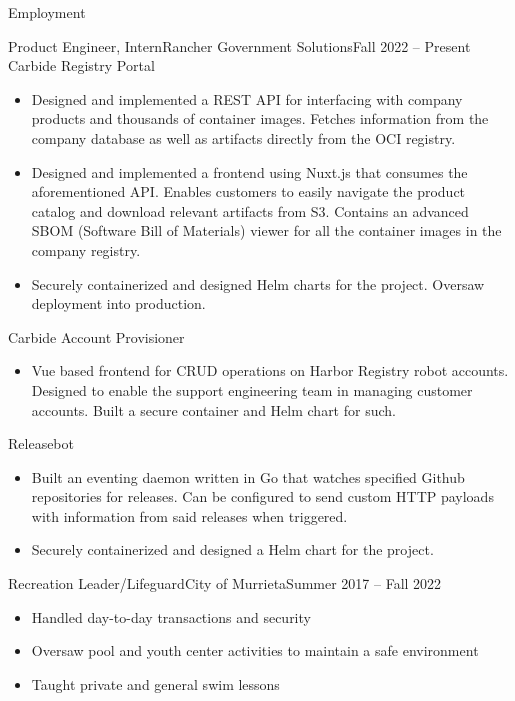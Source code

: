 \documentclass[]{resume}
\begin{document}
	\makeheader
	
	\begin{cvsection}{Employment}
		\begin{cvsubsection}{Product Engineer, Intern}{Rancher Government Solutions}{Fall 2022 -- Present}
			Carbide Registry Portal
			\begin{itemize}
				\item Designed and implemented a REST API for interfacing with company products and thousands of container images. Fetches information from the company database as well as artifacts directly from the OCI registry.
				\item Designed and implemented a frontend using Nuxt.js that consumes the aforementioned API. Enables customers to easily navigate the product catalog and download relevant artifacts from S3. Contains an advanced SBOM (Software Bill of Materials) viewer for all the container images in the company registry.
                \item Securely containerized and designed Helm charts for the project. Oversaw deployment into production.
			\end{itemize}
            Carbide Account Provisioner
            \begin{itemize}
                \item Vue based frontend for CRUD operations on Harbor Registry robot accounts. Designed to enable the support engineering team in managing customer accounts. Built a secure container and Helm chart for such.
            \end{itemize}
			Releasebot
			\begin{itemize}
				\item Built an eventing daemon written in Go that watches specified Github repositories for releases. Can be configured to send custom HTTP payloads with information from said releases when triggered.
                \item Securely containerized and designed a Helm chart for the project.
			\end{itemize}
		\end{cvsubsection}
		
		\begin{cvsubsection}{Recreation Leader/Lifeguard}{City of Murrieta}{Summer 2017 -- Fall 2022}	
			\begin{itemize}
				\item Handled day-to-day transactions and security
				\item Oversaw pool and youth center activities to maintain a safe environment
                \item Taught private and general swim lessons
			\end{itemize}
		\end{cvsubsection}
	\end{cvsection}
	
\end{document}
